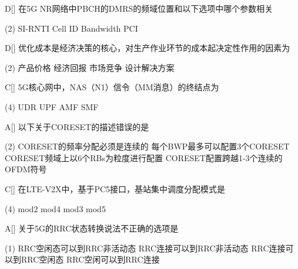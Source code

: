 \begin{choice}{D}[]
    在5G NR网络中PBCH的DMRS的频域位置和以下选项中哪个参数相关
    \begin{tasks}(2)
        \task SI-RNTI
        \task Cell ID
        \task  Bandwidth
        \task PCI
    \end{tasks}
\end{choice}


\begin{choice}{D}[]
    优化成本是经济决策的核心，对生产作业环节的成本起决定性作用的因素为
    \begin{tasks}(2)
        \task 产品价格
        \task 经济回报
        \task 市场竞争
        \task 设计解决方案
    \end{tasks}
\end{choice}


\begin{choice}{C}[]
    5G核心网中，NAS（N1）信令（MM消息）的终结点为
    \begin{tasks}(4)
        \task UDR
        \task UPF
        \task AMF
        \task SMF
    \end{tasks}
\end{choice}



\begin{choice}{A}[]
    以下关于CORESET的描述错误的是
    \begin{tasks}(2)
        \task CORESET的频率分配必须是连续的
        \task 每个BWP最多可以配置3个CORESET
        \task CORESET频域上以6个RBs为粒度进行配置
        \task CORESET配置跨越1-3个连续的OFDM符号
    \end{tasks}
\end{choice}


\begin{choice}{C}[]
    在LTE-V2X中，基于PC5接口，基站集中调度分配模式是
    \begin{tasks}(4)
        \task mod2
        \task mod4
        \task mod3
        \task mod5
    \end{tasks}
\end{choice}


\begin{choice}{A}[]
    关于5G的RRC状态转换说法不正确的选项是
    \begin{tasks}(1)
        \task RRC空闲态可以到RRC非活动态
        \task RRC连接可以到RRC非活动态
        \task RRC连接可以到RRC空闲态
        \task RRC空闲可以到RRC连接
    \end{tasks}
\end{choice}


